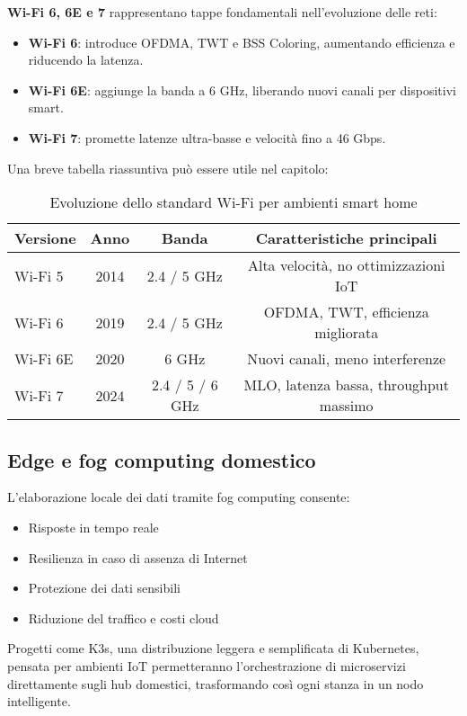 \textbf{Wi-Fi 6, 6E e 7} rappresentano tappe fondamentali nell’evoluzione delle reti:

\begin{itemize}
    \item \textbf{Wi-Fi 6}: introduce OFDMA, TWT e BSS Coloring, aumentando efficienza e riducendo la latenza.
    \item \textbf{Wi-Fi 6E}: aggiunge la banda a 6 GHz, liberando nuovi canali per dispositivi smart.
    \item \textbf{Wi-Fi 7}: promette latenze ultra-basse e velocità fino a 46 Gbps.
\end{itemize}

Una breve tabella riassuntiva può essere utile nel capitolo:

\begin{table}[H]
\centering
\begin{tabular}{lccc}
\toprule
\textbf{Versione} & \textbf{Anno} & \textbf{Banda} & \textbf{Caratteristiche principali} \\
\midrule
Wi-Fi 5 & 2014 & 2.4 / 5 GHz & Alta velocità, no ottimizzazioni IoT \\
Wi-Fi 6 & 2019 & 2.4 / 5 GHz & OFDMA, TWT, efficienza migliorata \\
Wi-Fi 6E & 2020 & 6 GHz & Nuovi canali, meno interferenze \\
Wi-Fi 7 & 2024 & 2.4 / 5 / 6 GHz & MLO, latenza bassa, throughput massimo \\
\bottomrule
\end{tabular}
\caption{Evoluzione dello standard Wi-Fi per ambienti smart home}
\end{table}

\subsection{Edge e fog computing domestico}

L’elaborazione locale dei dati tramite fog computing consente:
\begin{itemize}
    \item Risposte in tempo reale
    \item Resilienza in caso di assenza di Internet
    \item Protezione dei dati sensibili
    \item Riduzione del traffico e costi cloud
\end{itemize}

Progetti come K3s, una distribuzione leggera e semplificata di Kubernetes, pensata per ambienti IoT permetteranno l’orchestrazione di microservizi direttamente sugli hub domestici, trasformando così ogni stanza in un nodo intelligente.


